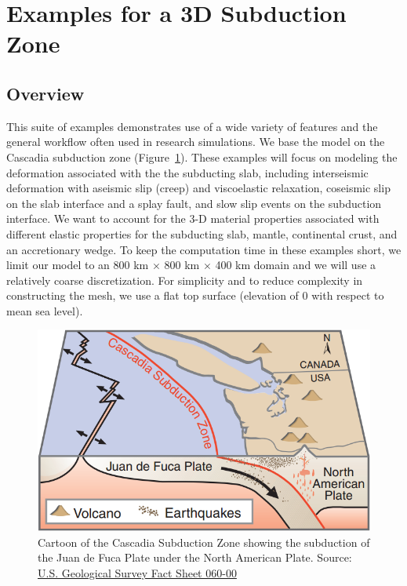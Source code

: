 \section{Examples for a 3D Subduction Zone}
\label{sec:example:subduction:3d}

\subsection{Overview}

This suite of examples demonstrates use of a wide variety of features
and the general workflow often used in research simulations. We base
the model on the Cascadia subduction zone
(Figure~\ref{fig:example:subduction:3d:cascadia}). These examples will
focus on modeling the deformation associated with the the subducting
slab, including interseismic deformation with aseismic slip (creep)
and viscoelastic relaxation, coseismic slip on the slab interface and
a splay fault, and slow slip events on the subduction interface. We want
to account for the 3-D material properties associated with different
elastic properties for the subducting slab, mantle, continental crust,
and an accretionary wedge. To keep the computation time in these
examples short, we limit our model to an 800 km $\times$ 800 km
$\times$ 400 km domain and we will use a relatively coarse
discretization. For simplicity and to reduce complexity in constructing
the mesh, we use a flat top surface (elevation of 0 with respect
to mean sea level).

\begin{figure}[htbp]
  \includegraphics[width=4.5in]{examples/figs/subduction3d_cascadia}
  \caption{Cartoon of the Cascadia Subduction Zone showing the
    subduction of the Juan de Fuca Plate under the North American
    Plate. Source:
    \href{https://pubs.usgs.gov/fs/2000/fs060-00/}{U.S. Geological
      Survey Fact Sheet 060-00}}
  \label{fig:example:subduction:3d:cascadia}
\end{figure}

